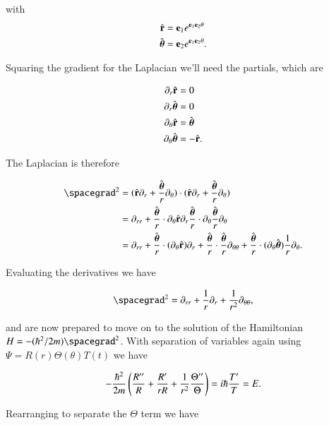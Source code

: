 with
\begin{align}\label{eqn:desaiCh4:141}
\hat{\mathbf{r}} &= \mathbf{e}_1 e^{\mathbf{e}_1 \mathbf{e}_2 \theta} \\
\hat{\boldsymbol{\theta}} &= \mathbf{e}_2 e^{\mathbf{e}_1 \mathbf{e}_2 \theta} .
\end{align}

Squaring the gradient for the Laplacian we'll need the partials, which are

\begin{align*}
\partial_r \hat{\mathbf{r}} &= 0 \\
\partial_r \hat{\boldsymbol{\theta}} &= 0 \\
\partial_\theta \hat{\mathbf{r}} &= \hat{\boldsymbol{\theta}} \\
\partial_\theta \hat{\boldsymbol{\theta}} &= -\hat{\mathbf{r}}.
\end{align*}

The Laplacian is therefore

\begin{align*}
\spacegrad^2 
&= 
(\rcap \partial_r + \frac{\thetacap}{r} \partial_\theta) \cdot
(\rcap \partial_r + \frac{\thetacap}{r} \partial_\theta) \\
&= 
\partial_{rr} + 
\frac{\thetacap}{r} \cdot \partial_\theta \rcap \partial_r 
\frac{\thetacap}{r} \cdot \partial_\theta \frac{\thetacap}{r} \partial_\theta \\
&= 
\partial_{rr} 
+ \frac{\thetacap}{r} \cdot (\partial_\theta \rcap) \partial_r 
+ \frac{\thetacap}{r} \cdot \frac{\thetacap}{r} \partial_{\theta\theta} 
+ \frac{\thetacap}{r} \cdot (\partial_\theta \thetacap) \inv{r} \partial_\theta .
\end{align*}

Evaluating the derivatives we have

\begin{align}\label{eqn:desaiCh4:150}
\spacegrad^2 = \partial_{rr} + \inv{r} \partial_r + \frac{1}{r^2} \partial_{\theta\theta},
\end{align}

and are now prepared to move on to the solution of the Hamiltonian $H = -(\hbar^2/2m) \spacegrad^2$.  With separation of variables again using $\Psi = R(r) \Theta(\theta) T(t)$ we have

\begin{align}\label{eqn:desaiCh4:151}
-\frac{\hbar^2}{2m} \left( \frac{R''}{R} + \frac{R'}{rR} + \frac{1}{r^2} \frac{\Theta''}{\Theta} \right) = i \hbar \frac{T'}{T} = E.
\end{align}

Rearranging to separate the $\Theta$ term we have

